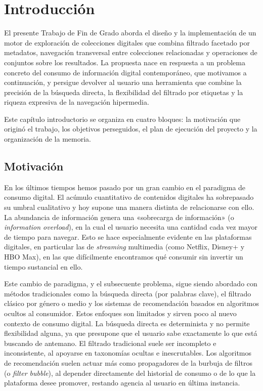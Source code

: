 \chapter{Introducción}
\label{cap:introduccion}


El presente Trabajo de Fin de Grado aborda el diseño y la implementación de un motor de
exploración de colecciones digitales que combina filtrado facetado por metadatos, navegación
transversal entre colecciones relacionadas y operaciones de conjuntos sobre los resultados.
La propuesta nace en respuesta a un problema concreto del consumo de información digital
contemporáneo, que motivamos a continuación, y persigue devolver al usuario una herramienta
que combine la precisión de la búsqueda directa, la flexibilidad del filtrado por etiquetas y
la riqueza expresiva de la navegación hipermedia.

Este capítulo introductorio se organiza en cuatro bloques: la motivación que originó el trabajo,
los objetivos perseguidos, el plan de ejecución del proyecto y la organización de la memoria.

\section{Motivación}
En los últimos tiempos hemos pasado por un gran cambio en el paradigma de consumo digital.
El acúmulo cuantitativo de contenidos digitales ha sobrepasado su umbral cualitativo y hoy supone una 
manera distinta de relacionarse con ello.
La abundancia de información genera una «sobrecarga de información» (o \textit{information overload}),
en la cual el usuario necesita una cantidad cada vez mayor de tiempo para navegar.
Esto se hace especialmente evidente en las plataformas digitales, en particular las de \textit{streaming} multimedia
(como Netflix, Disney+ y HBO Max), en las que difícilmente encontramos qué consumir sin invertir un tiempo sustancial
en ello.

Este cambio de paradigma, y el subsecuente problema, sigue siendo abordado con métodos tradicionales como la
búsqueda directa (por palabras clave), el filtrado clásico por género o medio y los sistemas de recomendación
basados en algoritmos ocultos al consumidor.
Estos enfoques son limitados y sirven poco al nuevo contexto de consumo digital.
La búsqueda directa es determinista y no permite flexibilidad alguna, ya que presupone que el usuario
sabe exactamente lo que está buscando de antemano.
El filtrado tradicional suele ser incompleto e inconsistente, al apoyarse en taxonomías ocultas e inescrutables.
Los algoritmos de recomendación suelen actuar más como propagadores de la burbuja de filtros
(o \textit{filter bubble}), al depender directamente del historial de consumo o de lo que la plataforma
desee promover, restando agencia al usuario en última instancia.

